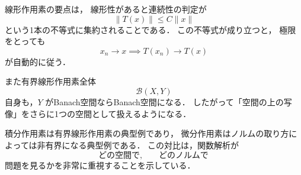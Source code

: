 線形作用素の要点は，
線形性があると連続性の判定が
\[
\|T(x)\|\le C\|x\|
\]
という1本の不等式に集約されることである．
この不等式が成り立つと，
極限をとっても
\[
x_n\to x \implies T(x_n)\to T(x)
\]
が自動的に従う．

また有界線形作用素全体
\[
\mathcal B(X,Y)
\]
自身も，$Y$ がBanach空間ならBanach空間になる．
したがって「空間の上の写像」をさらに1つの空間として扱えるようになる．

積分作用素は有界線形作用素の典型例であり，
微分作用素はノルムの取り方によっては非有界になる典型例である．
この対比は，関数解析が
\[
\text{どの空間で},\qquad
\text{どのノルムで}
\]
問題を見るかを非常に重視することを示している．
